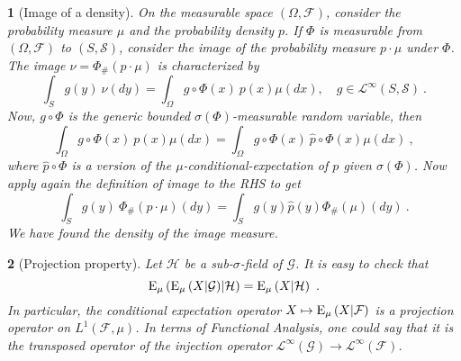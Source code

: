 \documentclass[12pt,a4paper]{amsart}
\theoremstyle{plain}%
\newtheorem{npar}{}%
\theoremstyle{definition}
\theoremstyle{remark}
\begin{document}
\begin{npar}[Image of a density]\normalfont
On the measurable space $(\Omega,\mathcal F)$, consider the probability measure $\mu$ and the probability density $p$. If $\Phi$ is measurable from $(\Omega,\mathcal F)$ to $(S,\mathcal S)$, consider the image of the probability measure $p \cdot \mu$ under $\Phi$. The image $\nu = \Phi_\#(p\cdot\mu)$ is characterized by
\begin{equation*}
\int_S g(y) \ \nu(dy) = \int_\Omega g\circ\Phi(x) \ p(x)\mu(dx), \quad g \in \mathcal L^{\infty}(S,\mathcal S) \ .  
\end{equation*}
Now, $g\circ\Phi$ is the generic bounded $\sigma(\Phi)$-measurable random variable, then
\begin{equation*}
  \int_\Omega g\circ\Phi(x) \ p(x)\mu(dx) = \int_\Omega g\circ\Phi(x) \ \widehat p\circ\Phi(x)\mu(dx) \ ,
\end{equation*}
where $\widehat p\circ\Phi$ is a version of the $\mu$-conditional-expectation of $p$ given $\sigma(\Phi)$. Now apply again the definition of image to the RHS to get
\begin{equation*}
  \int_S g(y) \ \Phi_\#(p \cdot \mu)(dy) = \int_S g(y) \widehat p (y) \Phi_\#(\mu)(dy) \ .
\end{equation*}
We have found the density of the image measure.
\end{npar}

\begin{npar}[Projection property] \normalfont Let $\mathcal H$ be a sub-$\sigma$-field of $\mathcal G$. It is easy to check that $$\operatorname{E}_{\mu}\left(\operatorname{E}_{\mu}\left(X \middle| \mathcal G\right) \middle| \mathcal H\right) = \operatorname{E}_{\mu}\left(X \middle| \mathcal H\right) \ . $$ In particular, the conditional expectation operator $X \mapsto \operatorname{E}_{\mu}\left(X \middle| \mathcal F\right)$ is a projection operator on $L^1(\mathcal F,\mu)$. In terms of Functional Analysis, one could say that it is the transposed operator of the injection operator $\mathcal L^{\infty}(\mathcal G) \to \mathcal L^{\infty}(\mathcal F)$. 
\end{npar}
\end{document}
